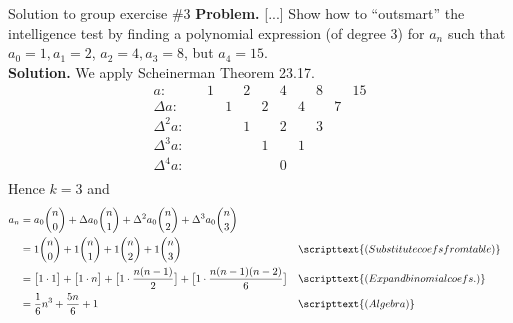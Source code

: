 \documentclass[10pt]{beamer}
\begin{document}
\begin{frame}{Solution to group exercise \#3}
\small 
\colorbox{red!30}{\textbf{Problem.}} [...] Show how to \enquote{outsmart} the intelligence test by finding a polynomial expression (of degree 3) for $a_n$ such that $a_0=1, a_1=2$, $a_2=4, a_3=8$, but $a_4=15$. \\
\vfill 
\colorbox{green!30}{\textbf{Solution.}} We apply Scheinerman Theorem 23.17.
\vspace{-.25cm}
\[
\begin{array}{ccccccccccc}
a:& & 1 &     & 2 &     & 4 &     & 8 &  &15 \\
\Delta a:& &  & 1    &  & 2    &  &  4   &  & 7  & \\
\Delta^2 a:& &  &     & 1 &     & 2 &     &  3 &   & \\
\Delta^3 a:& &  &     &  &  1   & &   1  &   &   & \\
\Delta^4 a:& &  &     &  &     & 0 &     &   &   & \\
\end{array}
\]
Hence $k=3$ and 
%
\begin{align*}
a_n &= a_0 \binom{n}{0} +	\Delta a_0 \binom{n}{1} + 		\Delta^2 a_0 \binom{n}{2} + 		\Delta^3 a_0 \binom{n}{3} \\
&= 1 \binom{n}{0} +	1  \binom{n}{1} + 		1 \binom{n}{2} + 		1 \binom{n}{3} && \scripttext{(Substitute coefs from table)} \\
&= \big[1 \cdot 1\big] +	 \big[1 \cdot n\big]  + 		\big[1 \cdot \frac{n (n-1)}{2}\big] + 		\big[1 \cdot \frac{n (n-1) (n-2)}{6}\big] && \scripttext{(Expand binomial coefs.)} \\
&= \frac{1}{6} n^3 + \frac{5n}{6} + 1 && \scripttext{(Algebra)}
\end{align*}


\end{frame}
\end{document}

